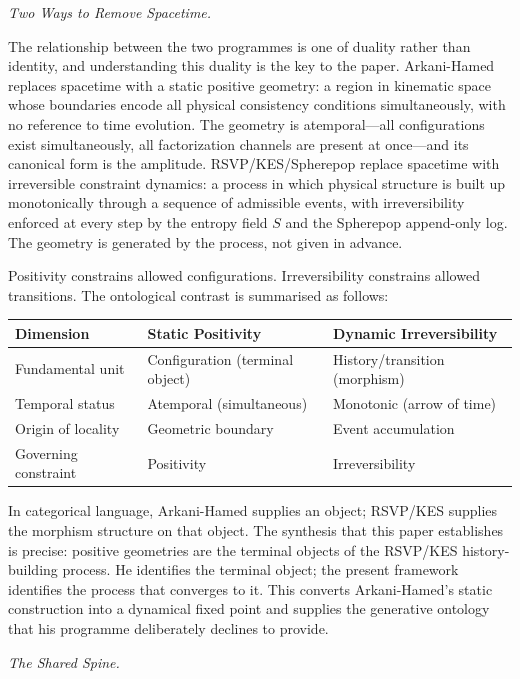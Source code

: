 \documentclass[11pt]{article}
\theoremstyle{plain}
\theoremstyle{definition}
\theoremstyle{remark}
\newcommand{\Sf}{S}
\begin{document}
\medskip\noindent\textit{Two Ways to Remove Spacetime.}

The relationship between the two programmes is one of duality rather than identity, and understanding this duality is the key to the paper. Arkani-Hamed replaces spacetime with a static positive geometry: a region in kinematic space whose boundaries encode all physical consistency conditions simultaneously, with no reference to time evolution. The geometry is atemporal---all configurations exist simultaneously, all factorization channels are present at once---and its canonical form is the amplitude. RSVP/KES/Spherepop replace spacetime with irreversible constraint dynamics: a process in which physical structure is built up monotonically through a sequence of admissible events, with irreversibility enforced at every step by the entropy field $\Sf$ and the Spherepop append-only log. The geometry is generated by the process, not given in advance.

Positivity constrains allowed configurations. Irreversibility constrains allowed transitions. The ontological contrast is summarised as follows:

\begin{center}
\begin{tabular}{lll}
\toprule
Dimension & Static Positivity & Dynamic Irreversibility \\
\midrule
Fundamental unit & Configuration (terminal object) & History/transition (morphism) \\
Temporal status & Atemporal (simultaneous) & Monotonic (arrow of time) \\
Origin of locality & Geometric boundary & Event accumulation \\
Governing constraint & Positivity & Irreversibility \\
\bottomrule
\end{tabular}
\end{center}

In categorical language, Arkani-Hamed supplies an object; RSVP/KES supplies the morphism structure on that object. The synthesis that this paper establishes is precise: positive geometries are the terminal objects of the RSVP/KES history-building process. He identifies the terminal object; the present framework identifies the process that converges to it. This converts Arkani-Hamed's static construction into a dynamical fixed point and supplies the generative ontology that his programme deliberately declines to provide.

\medskip\noindent\textit{The Shared Spine.}
\end{document}
